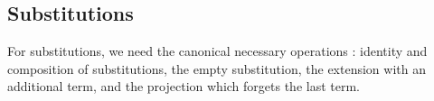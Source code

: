 \begin{AgdaAlign}
\subsection{Substitutions}\label{sec:subst}
For substitutions, we need the canonical necessary operations \cite{AltenkirchK16,Chapman09}: identity and composition of
substitutions, the empty substitution, the extension with an additional term, and the projection which forgets the last term.
\begin{code}%
%
\>[2]\AgdaSpace{}%
\AgdaSpace{}%
\AgdaSymbol{:}\AgdaSpace{}%
\AgdaSpace{}%
\AgdaSymbol{\{}\AgdaSymbol{\}}\AgdaSpace{}%
\AgdaSpace{}%
\AgdaSpace{}%
\AgdaSpace{}%
\AgdaSpace{}%
\AgdaSpace{}%
\AgdaSpace{}%
\AgdaSpace{}%
\AgdaSpace{}%
\<%
\\
\>[2][@{}l@{\AgdaIndent{0}}]%
\>[4]\AgdaSpace{}%
\AgdaSymbol{:}\AgdaSpace{}%
\AgdaSpace{}%
\AgdaSymbol{\{}\AgdaSymbol{\}}\AgdaSpace{}%
\AgdaSymbol{(}\AgdaSpace{}%
\AgdaSymbol{:}\AgdaSpace{}%
\AgdaSpace{}%
\AgdaSymbol{)}\AgdaSpace{}%
\AgdaSpace{}%
\AgdaSpace{}%
\AgdaSpace{}%
\<%
\\
%
\>[4]\AgdaSpace{}%
\AgdaSymbol{:}\AgdaSpace{}%
\AgdaSpace{}%
\AgdaSymbol{\{}\AgdaSymbol{\}}\AgdaSpace{}%
\AgdaSymbol{(}\AgdaSpace{}%
\AgdaSymbol{:}\AgdaSpace{}%
\AgdaSpace{}%
\AgdaSymbol{)}\AgdaSpace{}%
\AgdaSpace{}%
\AgdaSpace{}%
\AgdaSpace{}%
\<%
\\
%
\>[4]\AgdaOperator{\AgdaInductiveConstructor{\AgdaUnderscore{},\AgdaUnderscore{}}}\AgdaSpace{}%
\AgdaSymbol{:}\AgdaSpace{}%
\AgdaSpace{}%
\AgdaSymbol{\{}\AgdaSymbol{\}}\AgdaSpace{}%
\AgdaSymbol{\{}\AgdaSpace{}%
\AgdaSpace{}%
\AgdaSymbol{:}\AgdaSpace{}%
\AgdaSpace{}%
\AgdaSymbol{\}}\AgdaSpace{}%
\AgdaSymbol{\{}\AgdaSpace{}%
\AgdaSymbol{:}\AgdaSpace{}%
\AgdaSpace{}%
\AgdaSymbol{\}}\AgdaSpace{}%
\AgdaSpace{}%
\AgdaSpace{}%
\AgdaSpace{}%
\AgdaSpace{}%
\AgdaSpace{}%

\end{code}
\end{AgdaAlign}
